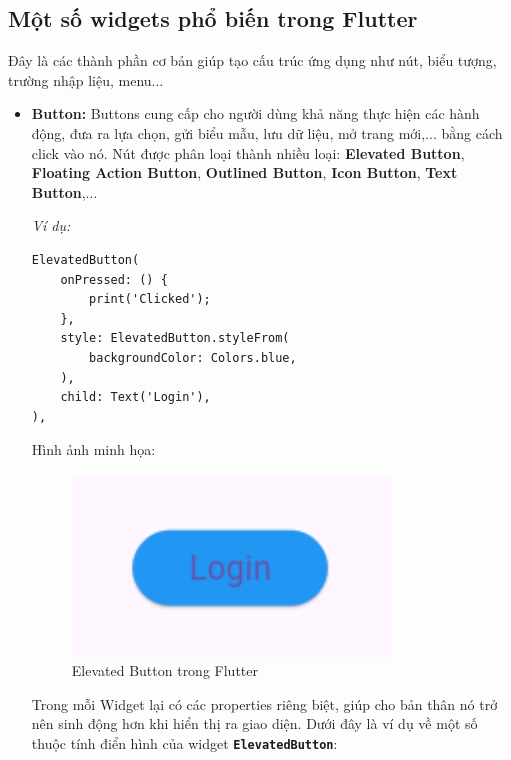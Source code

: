 \documentclass[../DoAn.tex]{subfiles}
\numberwithin{figure}{chapter}
\begin{document}
\subsection{Một số widgets phổ biến trong Flutter}
Đây là các thành phần cơ bản giúp tạo cấu trúc ứng dụng như nút, biểu tượng, trường nhập liệu, menu...
\begin{itemize}
\item \textbf{Button: } Buttons cung cấp cho người dùng khả năng thực hiện các hành động, đưa ra lựa chọn, gửi biểu mẫu, lưu dữ liệu, mở trang mới,... bằng cách click vào nó. Nút được phân loại thành nhiều loại: \textbf{Elevated Button}, \textbf{Floating Action Button}, \textbf{Outlined Button}, \textbf{Icon Button}, \textbf{Text Button},...

\textit{Ví dụ:}
\begin{lstlisting}
ElevatedButton(
    onPressed: () {
        print('Clicked'); 
    },
    style: ElevatedButton.styleFrom(
        backgroundColor: Colors.blue, 
    ),
    child: Text('Login'),
),
\end{lstlisting}

\begin{adjustwidth}{1.0em}{0pt}
Hình ảnh minh họa:
\begin{figure}[H]
    \centering
    \includegraphics[width=0.8\textwidth]{Hinhve/Chuong5/buttonWidget.png}
    \caption{Elevated Button trong Flutter}
    \label{fig:buttonwidget}
\end{figure}
\end{adjustwidth}

Trong mỗi Widget lại có các properties riêng biệt, giúp cho bản thân nó 
trở nên sinh động hơn khi hiển thị ra giao diện. Dưới đây là ví dụ về một số thuộc tính điển hình của widget \textbf{\texttt{ElevatedButton}}:


\end{itemize}
\end{document}
